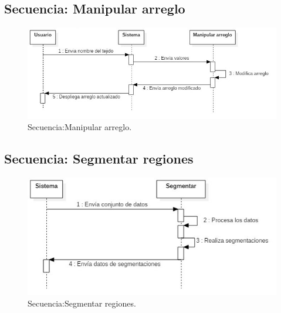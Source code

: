 \documentclass[12pt]{report}
\begin{document}
\subsection{Secuencia: Manipular arreglo}
\begin{figure}[H]
\centering
\includegraphics[width = 12 cm, height = 7 cm]{modificar_arreglo}
\caption{Secuencia:Manipular arreglo.}
\end{figure}

\subsection{Secuencia: Segmentar regiones}
\begin{figure}[H]
\centering
\includegraphics[width = 12 cm, height = 7 cm]{segmentacion}
\caption{Secuencia:Segmentar regiones.}
\end{figure}
\end{document}
